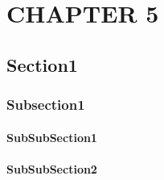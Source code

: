 \chapter{CHAPTER 5}
\label{chp:chapter5}

\section{Section1}
\subsection{Subsection1}
\subsubsection{SubSubSection1}
\subsubsection{SubSubSection2}
